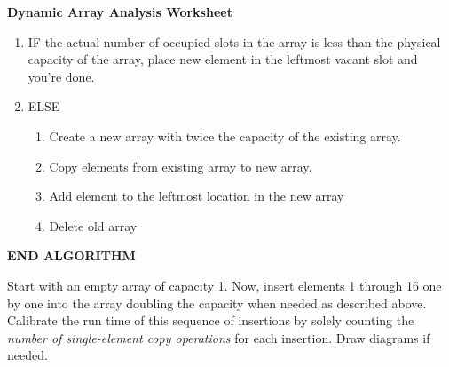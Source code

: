 \documentclass[12pt]{article}
\begin{document}
\newcommand{\I}{\mbox{{\em Int}}}
\newcommand{\lt}{\mbox{{\em left}}}
\newcommand{\rt}{\mbox{{\em right}}}
\newcommand{\ld}{\Delta^l}
\newcommand{\rd}{\Delta^r}
\newcommand{\lsp}[1]{\large\renewcommand{\baselinestretch}{#1}\normalsize}
\newcommand{\hsp}{\hspace{.2in}}

\def\Endwhile{\mbox{\bf endwhile\ }}
\def\Or{\mbox{\bf or\ }}
\def\Do{\mbox{\bf do\ }}
\def\Downto{\mbox{\bf downto\ }}
\def\Int{\mbox{\bf int\ }}
\def\To{\mbox{\bf to\ }}
\def\Repeat{\mbox{\bf repeat\ }}
\def\Until{\mbox{\bf until\ }}
\def\Return{\mbox{\bf return\ }}
\def\Not{\mbox{\bf not\ }}
\def\And{\mbox{\bf and\ }}
\def\For{\mbox{\bf for\ }}
\def\Foreach{\mbox{\bf foreach\ }}
\def\Else{\mbox{\bf else\ }}
\def\Elseif{\mbox{\bf elseif\ }}
\def\End{\mbox{\bf end\ }}
\def\If{\mbox{\bf if\ }}
\def\Mod{\mbox{\bf \ mod\ }}
\def\Then{\mbox{\bf then\ }}
\def\While{\mbox{\bf while\ }}
\def\Output{\mbox{\bf output\ }}


\lsp{1}
\pagestyle{plain}
\begin{center}
{\bf
Dynamic Array Analysis Worksheet
}
\end{center}



\begin{enumerate}
\item IF the actual number of occupied slots in the array is less than the physical capacity of the array, place new element in the leftmost vacant slot and you're done.
\item ELSE
\begin{enumerate}
\item Create a new array with twice the capacity of the existing array.
\item Copy elements from existing array to new array.
\item Add element to the leftmost location in the new array
\item Delete old array
\end{enumerate} 
\end{enumerate}
{\bf END ALGORITHM}

Start with an empty array of capacity 1. Now, insert elements 1 through 16 one by one into the array doubling the capacity when needed as described above. Calibrate the run time of this sequence of insertions by solely counting the {\em number of single-element copy operations} for each insertion. Draw diagrams if needed.
\end{document}
